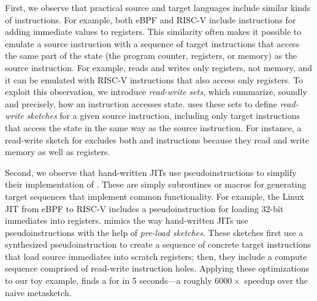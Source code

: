 First, we observe that practical source and target languages include similar
kinds of instructions. For example, both eBPF and RISC-V include instructions
for adding immediate values to registers. This similarity often makes it
possible to emulate a source instruction with a sequence of target instructions
that access the same part of the state (the program counter, registers, or
memory) as the source instruction. For example,  reads and writes
only registers, not memory, and it can be emulated with RISC-V instructions that
also access only registers. To exploit this observation, we introduce
\emph{read-write sets}, which summarize, soundly and precisely, how an
instruction accesses state. \jitsynth uses these sets to define \emph{read-write
sketches} for a given source instruction, including only target instructions
that access the state in the same way as the source instruction. For instance, a
read-write sketch for  excludes both  and  instructions
because they read and write memory as well as registers.\tighten

Second, we observe that hand-written JITs use pseudoinstructions to simplify
their implementation of \minicompilers. These are simply subroutines or macros
for generating target sequences that implement common functionality. For
example, the Linux JIT from eBPF to RISC-V includes a pseudoinstruction for
loading 32-bit immediates into registers. \jitsynth mimics the way hand-written
JITs use pseudoinstructions with the help of \emph{pre-load sketches}. These
sketches first use a synthesized pseudoinstruction to create a sequence of
concrete target instructions that load source immediates into scratch registers;
then, they include a compute sequence comprised of read-write instruction holes.
Applying these optimizations to our toy example, \jitsynth finds a \minicompiler
for  in {5 seconds}---a {roughly $6000\times$} speedup over the naive
metasketch.\tighten
